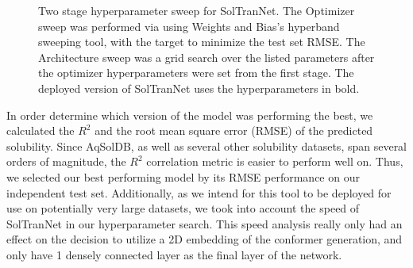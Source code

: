 \documentclass[journal=jmcmar,manuscript=article]{achemso}
\begin{document}
\begin{figure}[tb]
    \caption{Two stage hyperparameter sweep for SolTranNet. The Optimizer sweep was performed via using Weights and Bias's hyperband sweeping tool, with the target to minimize the test set RMSE. The Architecture sweep was a grid search over the listed parameters after the optimizer hyperparameters were set from the first stage. The deployed version of SolTranNet uses the hyperparameters in bold.}
    \label{tab:wandsweep}
\end{figure}

In order determine which version of the model was performing the best, we calculated the $R^2$ and the root mean square error (RMSE) of the predicted solubility.
Since AqSolDB, as well as several other solubility datasets, span several orders of magnitude, the $R^2$ correlation metric is easier to perform well on.
Thus, we selected our best performing model by its RMSE performance on our independent test set.
Additionally, as we intend for this tool to be deployed for use on potentially very large datasets, we took into account the speed of SolTranNet in our hyperparameter search.
This speed analysis really only had an effect on the decision to utilize a 2D embedding of the conformer generation, and only have 1 densely connected layer as the final layer of the network.
\end{document}
